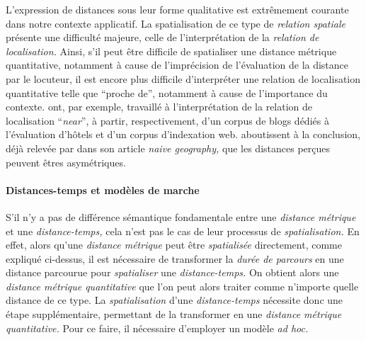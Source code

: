 L'expression de distances sous leur forme qualitative est extrêmement
courante dans notre contexte applicatif. La spatialisation de ce type
de \emph{relation spatiale} présente une difficulté majeure, celle de
l'interprétation de la \emph{relation de localisation.} Ainsi, s'il
peut être difficile de spatialiser une distance métrique quantitative,
notamment à cause de l'imprécision de l'évaluation de la distance par
le locuteur, il est encore plus difficile d’interpréter une relation
de localisation quantitative telle que \enquote{proche de}, notamment
à cause de l'importance du
contexte. \textcite{Wallgruen2014,Derungs2016} ont, par exemple,
travaillé à l'interprétation de la relation de localisation
\foreignquote{english}{\emph{near}}, à partir, respectivement, d'un
corpus de blogs dédiés à l'évaluation d'hôtels et d'un corpus
d'indexation web. \textcite{Wallgruen2014} aboutissent à la
conclusion, déjà relevée par \textcite{Egenhofer1995} dans son article
\emph{naive geography,} que les distances perçues peuvent êtres
asymétriques.

\paragraph{Distances-temps et modèles de marche}


S'il n'y a pas de différence sémantique fondamentale entre une
\emph{distance métrique} et une \emph{distance-temps,} cela n'est pas
le cas de leur processus de \emph{spatialisation.} En effet, alors
qu'une \emph{distance métrique} peut être \emph{spatialisée}
directement, comme expliqué ci-dessus, il est nécessaire de
transformer la \emph{durée de parcours} en une distance parcourue pour
\emph{spatialiser} une \emph{distance-temps.} On obtient alors une
\emph{distance métrique quantitative} que l'on peut alors traiter
comme n'importe quelle distance de ce type. La \emph{spatialisation}
d'une \emph{distance-temps} nécessite donc une étape supplémentaire,
permettant de la transformer en une \emph{distance métrique
  quantitative.} Pour ce faire, il nécessaire d'employer un modèle
\emph{ad hoc.}

